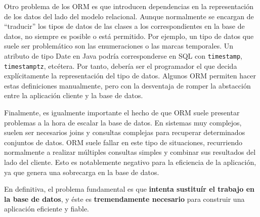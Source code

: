 \documentclass[12pt, a4paper]{article}
\begin{document}
Otro problema de los ORM es que introducen dependencias en la representación de los datos del lado del modelo relacional. Aunque normalmente se encargan de ``traducir'' los tipos de datos de las clases a los correspondientes en la base de datos, no siempre es posible o está permitido. Por ejemplo, un tipo de datos que suele ser problemático son las enumeraciones o las marcas temporales. Un atributo de tipo Date en Java podría corresponderse en SQL con \texttt{timestamp}, \texttt{timestamptz}, etcétera. Por tanto, debería ser el programador el que decida explícitamente la representación del tipo de datos. Algunos ORM permiten hacer estas definiciones manualmente, pero con la desventaja de romper la abstacción entre la aplicación cliente y la base de datos.

Finalmente, es igualmente importante el hecho de que ORM suele presentar problemas a la hora de escalar la base de datos. En sistemas muy complejos, suelen ser necesarios joins y consultas complejas para recuperar determinados conjuntos de datos. ORM suele fallar en este tipo de situaciones, recurriendo normalmente a realizar múltiples consultas simples y combinar sus resultados del lado del cliente. Esto es notablemente negativo para la eficiencia de la aplicación, ya que genera una sobrecarga en la base de datos.

En definitiva, el problema fundamental es que \textbf{intenta sustituír el trabajo en la base de datos}, y éste es \textbf{tremendamente necesario} para construir una aplicación eficiente y fiable. 

\nocite{*}

\end{document}
